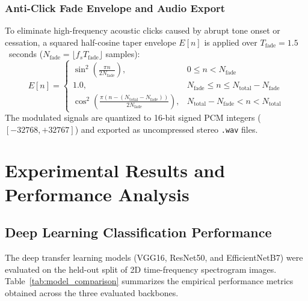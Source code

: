 \documentclass[12pt, a4paper]{report}
\begin{document}
\subsection{Anti-Click Fade Envelope and Audio Export}
To eliminate high-frequency acoustic clicks caused by abrupt tone onset or cessation, a squared half-cosine taper envelope $E[n]$ is applied over $T_{\text{fade}} = 1.5$~seconds ($N_{\text{fade}} = \lfloor f_s T_{\text{fade}} \rfloor$ samples):
\begin{equation}
    E[n] = 
    \begin{cases}
        \sin^2\left(\frac{\pi n}{2 N_{\text{fade}}}\right), & 0 \le n < N_{\text{fade}} \\[1ex]
        1.0, & N_{\text{fade}} \le n \le N_{\text{total}} - N_{\text{fade}} \\[1ex]
        \cos^2\left(\frac{\pi (n - (N_{\text{total}} - N_{\text{fade}}))}{2 N_{\text{fade}}}\right), & N_{\text{total}} - N_{\text{fade}} < n < N_{\text{total}}
    \end{cases}
    \label{eq:fade_envelope}
\end{equation}
The modulated signals are quantized to 16-bit signed PCM integers ($[-32768, +32767]$) and exported as uncompressed stereo \texttt{.wav} files.

\chapter{Experimental Results and Performance Analysis}
\label{ch:experimental_results}

\section{Deep Learning Classification Performance}
\label{sec:dl_performance}
The deep transfer learning models (VGG16, ResNet50, and EfficientNetB7) were evaluated on the held-out split of 2D time-frequency spectrogram images. Table~\ref{tab:model_comparison} summarizes the empirical performance metrics obtained across the three evaluated backbones.
\end{document}
